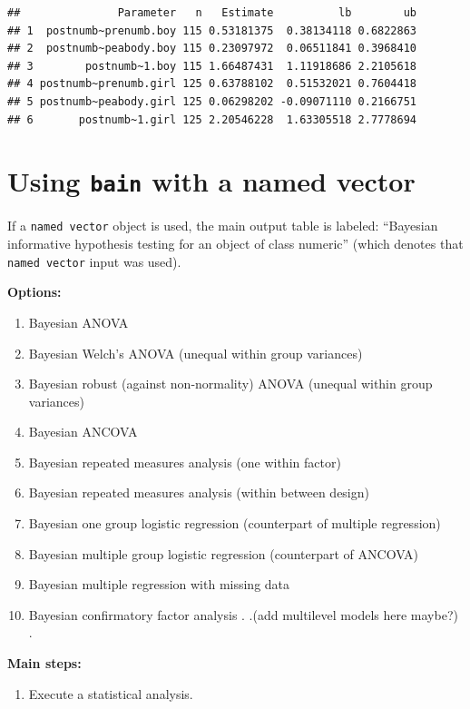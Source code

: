 \documentclass[
]{book}
\providecommand{\tightlist}{%
  \setlength{\itemsep}{0pt}\setlength{\parskip}{0pt}}
\begin{document}
\begin{verbatim}
##               Parameter   n   Estimate          lb        ub
## 1  postnumb~prenumb.boy 115 0.53181375  0.38134118 0.6822863
## 2  postnumb~peabody.boy 115 0.23097972  0.06511841 0.3968410
## 3        postnumb~1.boy 115 1.66487431  1.11918686 2.2105618
## 4 postnumb~prenumb.girl 125 0.63788102  0.51532021 0.7604418
## 5 postnumb~peabody.girl 125 0.06298202 -0.09071110 0.2166751
## 6       postnumb~1.girl 125 2.20546228  1.63305518 2.7778694
\end{verbatim}

\hypertarget{named}{%
\section{\texorpdfstring{Using \texttt{bain} with a named vector}{Using bain with a named vector}}\label{named}}

If a \texttt{named\ vector} object is used, the main output table is labeled:
``Bayesian informative hypothesis testing for an object
of class numeric'' (which denotes that \texttt{named\ vector} input was used).

\textbf{Options:}

\begin{enumerate}
\def\labelenumi{\alph{enumi})}
\tightlist
\item
  Bayesian ANOVA
\item
  Bayesian Welch's ANOVA (unequal within group variances)
\item
  Bayesian robust (against non-normality) ANOVA (unequal within group variances)
\item
  Bayesian ANCOVA
\item
  Bayesian repeated measures analysis (one within factor)
\item
  Bayesian repeated measures analysis (within between design)
\item
  Bayesian one group logistic regression (counterpart of multiple
  regression)
\item
  Bayesian multiple group logistic regression (counterpart of ANCOVA)
\item
  Bayesian multiple regression with missing data
\item
  Bayesian confirmatory factor analysis
  .
  .(add multilevel models here maybe?)
  .
\end{enumerate}

\textbf{Main steps:}

\begin{enumerate}
\def\labelenumi{\arabic{enumi})}
\tightlist
\item
  Execute a statistical analysis.
\end{enumerate}
\end{document}
